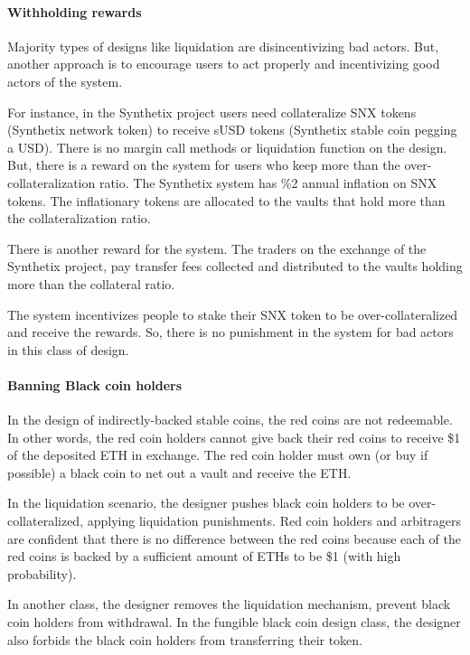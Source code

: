 \paragraph{Withholding rewards}

Majority types of designs like liquidation are disincentivizing bad actors. But, another approach is to encourage users to act properly and incentivizing good actors of the system.

For instance, in the Synthetix project users need collateralize SNX tokens (Synthetix network token) to receive sUSD tokens (Synthetix stable coin pegging a USD). There is no margin call methods or liquidation function on the design. But, there is a reward on the system for users who keep more than the over-collateralization ratio. 
The Synthetix system has \%2 annual inflation on SNX tokens. The inflationary tokens are allocated to the vaults that hold more than the collateralization ratio.

There is another reward for the system. The traders on the exchange of the Synthetix project, pay transfer fees collected and distributed to the vaults holding more than the collateral ratio.

The system incentivizes people to stake their SNX token to be over-collateralized and receive the rewards. So, there is no punishment in the system for bad actors in this class of design.

\paragraph{Banning Black coin holders}

In the design of indirectly-backed stable coins, the red coins are not redeemable. In other words, the red coin holders cannot give back their red coins to receive \$1 of the deposited ETH in exchange. The red coin holder must own (or buy if possible) a black coin to net out a vault and receive the ETH.

In the liquidation scenario, the designer pushes black coin holders to be over-collateralized, applying liquidation punishments. Red coin holders and arbitragers are confident that there is no difference between the red coins because each of the red coins is backed by a sufficient amount of ETHs to be \$1 (with high probability).

In another class, the designer removes the liquidation mechanism, prevent black coin holders from withdrawal. In the fungible black coin design class, the designer also forbids the black coin holders from transferring their token. 

